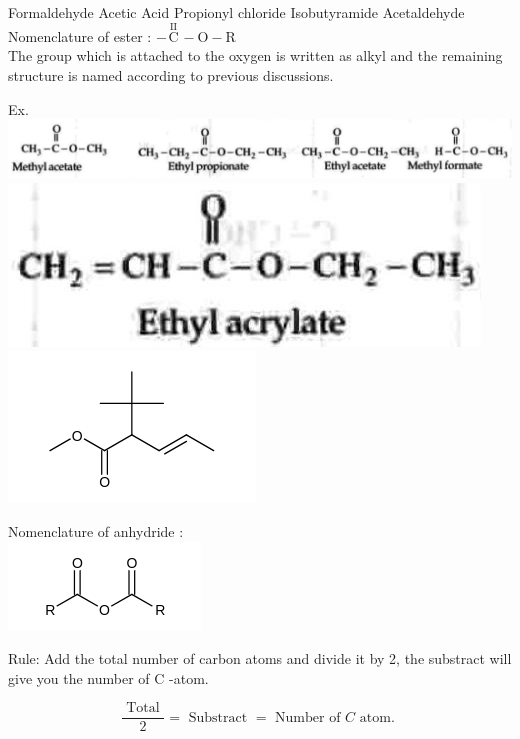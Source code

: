 \documentclass[10pt]{article}
\begin{document}
Formaldehyde Acetic Acid Propionyl chloride Isobutyramide Acetaldehyde\\
Nomenclature of ester : $-\stackrel{\text { II }}{\mathrm{C}}-\mathrm{O}-\mathrm{R}$\\
The group which is attached to the oxygen is written as alkyl and the remaining structure is named according to previous discussions.

Ex.\\
\includegraphics[max width=\textwidth, center]{2025_01_28_8470952b98110cec3aabg-015(1)}\\
\includegraphics[max width=\textwidth, center]{2025_01_28_8470952b98110cec3aabg-015}\\
\includegraphics{smile-78fea33a78700013869cd81231b83881b1b67435}

Nomenclature of anhydride :\\
\includegraphics{smile-d0d278368cb4794c6be73815cd24cfdbad7c08fa}

Rule: Add the total number of carbon atoms and divide it by 2, the substract will give you the number of C -atom.

$$
\frac{\text { Total }}{2}=\text { Substract }=\text { Number of } C \text { atom. }
$$
\end{document}
